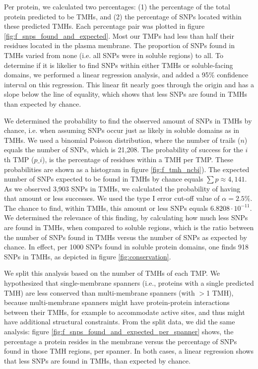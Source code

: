 Per protein, we calculated two percentages: 
(1) the percentage of the total protein predicted to be TMHs, 
and (2) the percentage of SNPs located within these predicted TMHs.
Each percentage pair was plotted in figure \ref{fig:f_snps_found_and_expected}.
Most our TMPs had less than half their residues located in the 
plasma membrane.
The proportion of SNPs found in TMHs varied from 
none (i.e. all SNPs were in
soluble regions) to all.
To determine if it is likelier to find SNPs within either TMHs or
soluble-facing domains, we performed a linear regression analysis,
and added a 95\% confidence interval on this regression.
This linear fit nearly goes through the origin and has a slope
below the line of equality,
which shows that less SNPs are found in TMHs than expected by chance.

We determined the probability to find the observed amount
of SNPs in TMHs by chance, i.e. when assuming SNPs occur 
just as likely in soluble domains as in TMHs.
We used a binomial Poisson distribution, 
where the number of trails ($n$) equals the number of SNPs, 
which is 21,208. 
The probability of success for the $i$th TMP ($p\_i$), 
is the percentage of residues within a TMH per TMP. 
These probabilities are shown as a histogram 
in figure \ref{fig:f_tmh_ncbi}). 
The expected number of SNPs expected to be found in 
TMHs by chance equals $\sum{p} \approx 4,141$.
As we observed 3,903 SNPs in TMHs, 
we calculated the probability of having that amount or less successes.
We used the type I error cut-off value of $\alpha = 2.5\%$.
The chance to find, within TMHs, this amount or less SNPs 
equals $6.8208 \cdot 10^{-11}$.
We determined the relevance of this finding, by
calculating how much less SNPs are found in TMHs,
when compared to soluble regions, which is the
ratio between the number of SNPs found in TMHs
versus the number of SNPs as expected by chance.
In effect, per 1000 SNPs found in soluble protein domains, 
one finds 918 SNPs in TMHs,
as depicted in figure \ref{fig:conservation}. 

We split this analysis based on the number of TMHs
of each TMP. 
We hypothesized that single-membrane spanners (i.e., proteins
with a single predicted TMH) are less conserved than multi-membrane spanners (with $>$1 TMH),
because multi-membrane spanners
might have protein-protein interactions between their TMHs, 
for example to accommodate active sites, and 
thus might have additional structural constraints.
From the split data, we did the same analysis:
figure \ref{fig:f_snps_found_and_expected_per_spanner} 
shows, the percentage a protein resides in the membrane versus the
percentage of SNPs found in those TMH regions, per spanner.
In both cases, a linear regression shows that less
SNPs are found in TMHs, than expected by chance.

